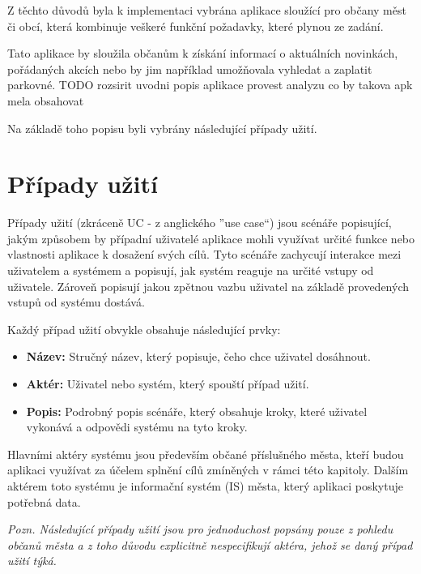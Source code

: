 Z těchto důvodů byla k implementaci vybrána aplikace sloužící pro občany měst či obcí, která kombinuje veškeré funkční požadavky, které plynou ze zadání.

Tato aplikace by sloužila občanům k získání informací o aktuálních novinkách, pořádaných akcích nebo by jim například umožňovala vyhledat a zaplatit parkovné.
TODO rozsirit uvodni popis aplikace provest analyzu co by takova apk mela obsahovat

Na základě toho popisu byli vybrány následující případy užití.

\section{Případy užití}
Případy užití  (zkráceně UC - z anglického ”use case“) jsou scénáře popisující, jakým způsobem by případní uživatelé aplikace mohli využívat určité funkce nebo
vlastnosti aplikace k dosažení svých cílů. \cite{figmaUseCase} Tyto scénáře zachycují interakce mezi uživatelem a systémem a popisují, jak systém reaguje na určité vstupy od 
uživatele. Zároveň popisují jakou zpětnou vazbu uživatel na základě provedených vstupů od systému dostává.

\medskip

Každý případ užití obvykle obsahuje následující prvky:

\begin{itemize}
  \item \textbf{Název:} Stručný název, který popisuje, čeho chce uživatel dosáhnout.
  \item \textbf{Aktér:} Uživatel nebo systém, který spouští případ užití.
  \item \textbf{Popis:} Podrobný popis scénáře, který obsahuje kroky, které uživatel vykonává a odpovědi systému na tyto kroky.
\end{itemize}

Hlavními aktéry systému jsou především občané příslušného města, kteří budou aplikaci využívat za účelem splnění cílů 
zmíněných v rámci této kapitoly. 
Dalším aktérem toto systému je informační systém (IS) města, který aplikaci poskytuje potřebná data. 

\smallskip
\textit{Pozn. Následující případy užití jsou pro jednoduchost popsány pouze z pohledu občanů města a z toho důvodu 
explicitně nespecifikují aktéra, jehož se daný případ užití týká.
}

